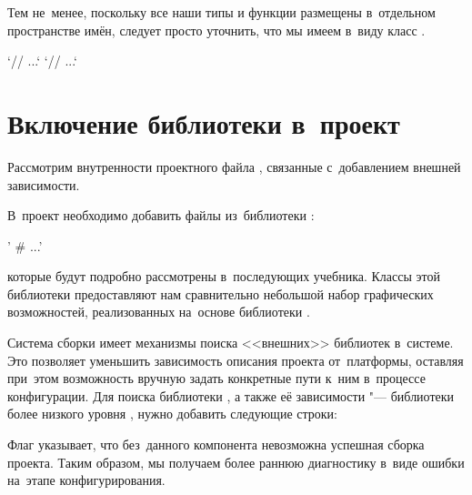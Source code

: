 Тем не~менее, поскольку все наши типы и функции размещены в~отдельном пространстве имён, следует просто уточнить, что мы имеем в~виду класс .

\cpp`// ...`
\cpp`// ...`



\section{Включение библиотеки  в~проект}
Рассмотрим внутренности проектного файла , связанные с~добавлением внешней зависимости.

В~проект необходимо добавить файлы из~библиотеки :

\cmake'    # ...'

\noindent которые будут подробно рассмотрены в~последующих  учебника. Классы этой библиотеки предоставляют нам сравнительно небольшой набор графических возможностей, реализованных на~основе библиотеки .

Система сборки  имеет механизмы поиска <<внешних>> библиотек в~системе. Это позволяет уменьшить зависимость описания проекта от~платформы, оставляя при~этом возможность вручную задать конкретные пути к~ним в~процессе конфигурации. Для поиска библиотеки , а также её зависимости "--- библиотеки более низкого уровня , нужно добавить следующие строки:


\noindent Флаг  указывает, что без~данного компонента невозможна успешная сборка проекта. Таким образом, мы получаем более раннюю диагностику в~виде ошибки на~этапе конфигурирования.


